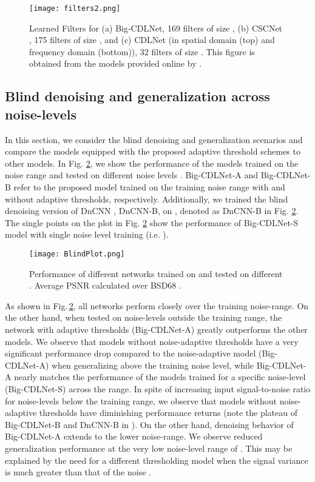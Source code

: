 \documentclass[conference]{IEEEtran}
\begin{document}
\begin{figure}[ht]
\centering
\texttt{[image: filters2.png]}
\caption{Learned Filters for (a) Big-CDLNet, 169 filters of size ,  (b) CSCNet \cite{Simon2019}, 175 filters of size , and (c) CDLNet (in spatial domain (top) and frequency domain (bottom)), 32 filters of size .  This figure is obtained from the models provided online by \cite{Simon2019}.}
\label{fig:filters}
\end{figure}

\subsection{Blind denoising and generalization across noise-levels} \label{sec:exp_blind}
In this section, we consider the blind denoising and generalization scenarios and compare the models equipped with the proposed adaptive threshold schemes to other models. In Fig. \ref{fig:BlindPlot}, we show the performance of the models trained on the noise range  and tested on different noise levels . Big-CDLNet-A and Big-CDLNet-B refer to the proposed model trained on the training noise range with and without adaptive thresholds, respectively. Additionally, we trained the blind denoising version of DnCNN \cite{DnCNN}, DnCNN-B, on , denoted as DnCNN-B in Fig. \ref{fig:BlindPlot}. The single points on the plot in Fig. \ref{fig:BlindPlot} show the performance of Big-CDLNet-S model with single noise level training (i.e. ). 

\begin{figure}[ht]
\centering
\texttt{[image: BlindPlot.png]}
\caption{Performance of different networks trained on  and tested on different . Average PSNR calculated over BSD68 \cite{bsd}.}
\label{fig:BlindPlot}
\end{figure}

As shown in Fig.\,\ref{fig:BlindPlot}, all networks perform closely over the training noise-range. On the other hand, when tested on noise-levels outside the training range, the network with adaptive thresholds (Big-CDLNet-A) greatly outperforms the other models. We observe that models without noise-adaptive thresholds have a very significant performance drop compared to the noise-adaptive model (Big-CDLNet-A) when generalizing above the training noise level, while Big-CDLNet-A nearly matches the performance of the models trained for a specific noise-level (Big-CDLNet-S) across the range. In spite of increasing input signal-to-noise ratio for noise-levels below the training range, we  observe that models without noise-adaptive thresholds have diminishing performance returns (note the plateau of Big-CDLNet-B and DnCNN-B in ). On the other hand, denoising behavior of Big-CDLNet-A extends to the lower noise-range. We observe reduced generalization performance at the very low noise-level range of . This may be explained by the need for a different thresholding model when the signal variance is much greater than that of the noise \cite{Mallat}.
\end{document}
